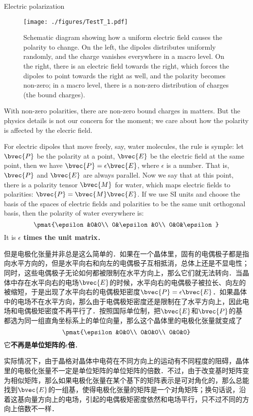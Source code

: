 \begin{example}{Electric polarization}
\begin{figure}[ht]
\centering
\texttt{[image: ./figures/TestT\_1.pdf]}
\caption{Schematic diagram showing how a uniform electric field causes the polarity to change. On the left, the dipoles distributes uniformly randomly, and the charge vanishes everywhere in a macro level. On the right, there is an electric field towards the right, which forces the dipoles to point towards the right as well, and the polarity becomes non-zero; in a macro level, there is a non-zero distribution of charges (the bound charges). } \label{TestT_fig1}
\end{figure}




With non-zero polarities, there are non-zero bound charges in matters. But the physics details is not our concern for the moment; we care about how the polarity is affected by the elecric field. 

For electric dipoles that move freely, say, water molecules, the rule is symple: let $\bvec{P}$ be the polarity at a point, $\bvec{E}$ be the electric field at the same point, then we have $\bvec{P}=\epsilon\bvec{E}$, where $\epsilon$ is a number. That is, $\bvec{P}$ and $\bvec{E}$ are always parallel. Now we say that at this point, there is a polarity tensor $\bvec{M}$ for water, which maps electric fields to polarities: $\bvec{P}=\bvec{M}\bvec{E}$. If we use SI units and choose the basis of the spaces of electric fields and polarities to be the same unit orthogonal basis, then the polarity of water everywhere is: 
\begin{equation}
\pmat{\epsilon&0&0\\ 0&\epsilon&0\\ 0&0&\epsilon}
\end{equation}
It is \textbf{$\epsilon$ times the unit matrix}．

但是电极化张量并非总是这么简单的．如果在一个晶体里，固有的电偶极子都是指向水平方向的，但是水平向右和向左的电偶极子互相抵消，总体上还是不显电性；同时，这些电偶极子无论如何都被限制在水平方向上，那么它们就无法转向．当晶体中存在水平向右的电场$\bvec{E}$的时候，水平向右的电偶极子被拉长、向左的被缩短，于是出现了水平向右的电偶极矩密度$\bvec{P}=\epsilon\bvec{E}$．如果晶体中的电场不在水平方向，那么由于电偶极矩密度还是限制在了水平方向上，因此电场和电偶极矩密度不再平行了．按照国际单位制，把$\bvec{E}$和$\bvec{P}$的基都选为同一组直角坐标系上的单位向量，那么这个晶体里的电极化张量就变成了
\begin{equation}
\pmat{\epsilon&0&0\\ 0&0&0\\ 0&0&0}
\end{equation}
它\textbf{不再是单位矩阵的$\epsilon$倍}．

实际情况下，由于晶格对晶体中电荷在不同方向上的运动有不同程度的阻碍，晶体里的电极化张量不一定是单位矩阵的单位矩阵的倍数．不过，由于改变基时矩阵变为相似矩阵，那么如果电极化张量在某个基下的矩阵表示是可对角化的，那么总能找到$\bvec{E}$的一组基，使得电极化张量的矩阵是一个对角矩阵；换句话说，沿着这基向量方向上的电场，引起的电偶极矩密度依然和电场平行，只不过不同的方向上倍数不一样．

\end{example}


